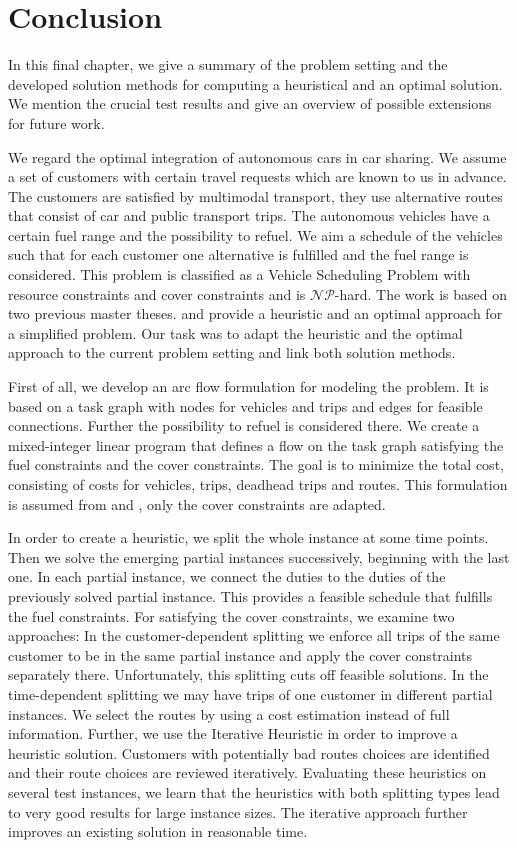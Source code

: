 \chapter{Conclusion}
\label{ch:conclusion}

In this final chapter, we give a summary of the problem setting and the developed solution methods for computing a heuristical and an optimal solution. We mention the crucial test results and give an overview of possible extensions for future work.

We regard the optimal integration of autonomous cars in car sharing. We assume a set of customers with certain travel requests which are known to us in advance. The customers are satisfied by multimodal transport, \ie they use alternative routes that consist of car and public transport trips. The autonomous vehicles have a certain fuel range and the possibility to refuel. We aim a schedule of the vehicles such that for each customer one alternative is fulfilled and the fuel range is considered. This problem is classified as a Vehicle Scheduling Problem with resource constraints and cover constraints and is $\mathcal{NP}$-hard. The work is based on two previous master theses. \cite{Kaiser} and \cite{Knoll} provide a heuristic and an optimal approach for a simplified problem. Our task was to adapt the heuristic and the optimal approach to the current problem setting and link both solution methods.

First of all, we develop an arc flow formulation for modeling the problem. It is based on a task graph with nodes for vehicles and trips and edges for feasible connections. Further the possibility to refuel is considered there. We create a mixed-integer linear program that defines a flow on the task graph satisfying the fuel constraints and the cover constraints. The goal is to minimize the total cost, consisting of costs for vehicles, trips, deadhead trips and routes. This formulation is assumed from \cite{Kaiser} and \cite{Knoll}, only the cover constraints are adapted.

In order to create a heuristic, we split the whole instance at some time points. Then we solve the emerging partial instances successively, beginning with the last one. In each partial instance, we connect the duties to the duties of the previously solved partial instance. This provides a feasible schedule that fulfills the fuel constraints. For satisfying the cover constraints, we examine two approaches: In the customer-dependent splitting we enforce all trips of the same customer to be in the same partial instance and apply the cover constraints separately there. Unfortunately, this splitting cuts off feasible solutions. In the time-dependent splitting we may have trips of one customer in different partial instances. We select the routes by using a cost estimation instead of full information. Further, we use the Iterative Heuristic in order to improve a heuristic solution. Customers with potentially bad routes choices are identified and their route choices are reviewed iteratively. Evaluating these heuristics on several test instances, we learn that the heuristics with both splitting types lead to very good results for large instance sizes. The iterative approach further improves an existing solution in reasonable time.

